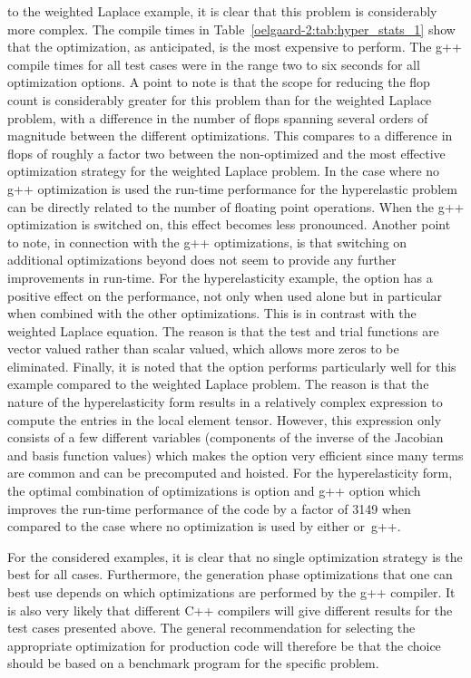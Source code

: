 to the weighted Laplace example, it is clear that this problem is
considerably more complex.  The \ffc{} compile times in
Table~\ref{oelgaard-2:tab:hyper_stats_1} show that the 
optimization, as anticipated, is the most expensive to perform.  The
g++ compile times for all test cases were in the range two to six
seconds for all optimization options.  A point to note is that the
scope for reducing the flop count is considerably greater for this
problem than for the weighted Laplace problem, with a difference in
the number of flops spanning several orders of magnitude between the
different
\ffc{} optimizations.  This compares to a difference in flops of
roughly a factor two between the non-optimized and the most effective
optimization strategy for the weighted Laplace problem.  In the case
where no g++ optimization is used the run-time performance for the
hyperelastic problem can be directly related to the number of floating
point operations.  When the g++ optimization  is switched on,
this effect becomes less pronounced.  Another point to note, in
connection with the g++ optimizations, is that switching on additional
optimizations beyond  does not seem to provide any further
improvements in run-time.  For the hyperelasticity example, the option
 has a positive effect on the performance, not only when
used alone but in particular when combined with the other \ffc{}
optimizations.  This is in contrast with the weighted Laplace
equation. The reason is that the test and trial functions are vector
valued rather than scalar valued, which allows more zeros to be
eliminated.  Finally, it is noted that the  option
performs particularly well for this example compared to the weighted
Laplace problem.  The reason is that the nature of the hyperelasticity
form results in a relatively complex expression to compute the entries
in the local element tensor.  However, this expression only consists
of a few different variables (components of the inverse of the
Jacobian and basis function values) which makes the 
option very efficient since many terms are common and can be
precomputed and hoisted.  For the hyperelasticity form, the optimal
combination of optimizations is \ffc{} option  and
g++ option  which improves the run-time
performance of the code by a factor of 3149 when compared to the case
where no optimization is used by either \ffc{} or~g++.

For the considered examples, it is clear that no single optimization
strategy is the best for all cases.  Furthermore, the generation phase
optimizations that one can best use depends on which optimizations are
performed by the g++ compiler.  It is also very likely that different
C++ compilers will give different results for the test cases presented
above.  The general recommendation for selecting the appropriate
optimization for production code will therefore be that the choice
should be based on a benchmark program for the specific problem.

